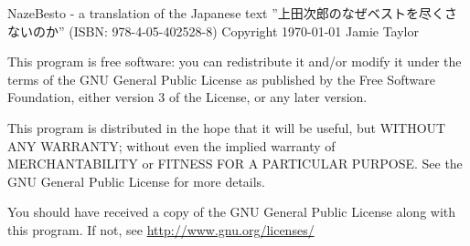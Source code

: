 NazeBesto - a translation of the Japanese text ”上田次郎のなぜベストを尽くさないのか” (ISBN: 978-4-05-402528-8) Copyright \today{} Jamie Taylor
\par This program is free software: you can redistribute it and/or modify it under the terms of the GNU General Public License as published by the Free Software Foundation, either version 3 of the License, or any later version.
\par This program is distributed in the hope that it will be useful, but WITHOUT ANY WARRANTY; without even the implied warranty of MERCHANTABILITY or FITNESS FOR A PARTICULAR PURPOSE.  See the GNU General Public License for more details.
\par You should have received a copy of the GNU General Public License along with this program.  If not, see \href{http://www.gnu.org/licenses/}{http://www.gnu.org/licenses/}